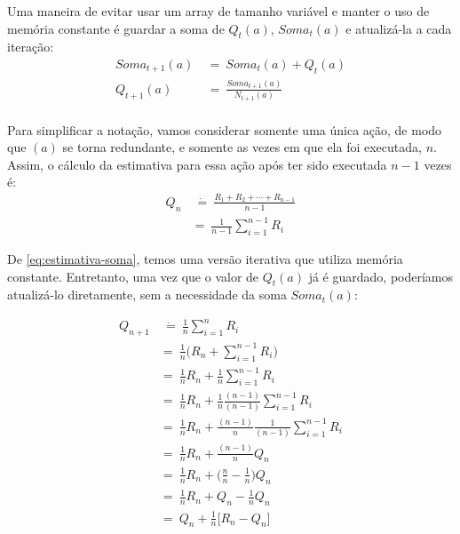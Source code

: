 \documentclass{article}
\begin{document}
        Uma maneira de evitar usar um array de tamanho variável e manter o uso de memória constante é guardar a soma de $Q_t(a)$, $Soma_t(a)$ e atualizá-la a cada iteração:
        \begin{equation}
        \label{eq:estimativa-soma}
        \begin{split}
            Soma_{t+1}(a) & \ = \ Soma_t(a) + Q_t(a) \\
            Q_{t+1}(a) & \ = \ \frac{Soma_{t+1}(a)}{N_{t+1}(a)}  \\
        \end{split}
        \end{equation}

        Para simplificar a notação, vamos considerar somente uma única ação, de modo que $(a)$ se torna redundante, e somente as vezes em que ela foi executada, $n$. Assim, o cálculo da estimativa para essa ação após ter sido executada $n-1$ vezes é:
        \begin{equation}
        \begin{split}
            Q_n & \ \dot{=} \ \frac{R_1 + R_2 + \cdots + R_{n-1}}{n - 1}\\
            & = \ \frac{1}{n-1} \sum_{i=1}^{n-1} R_i
        \end{split}
        \end{equation}
        
        De \eqref{eq:estimativa-soma}, temos uma versão iterativa que utiliza memória constante. Entretanto, uma vez que o valor de $Q_t(a)$ já é guardado, poderíamos atualizá-lo diretamente, sem a necessidade da soma $Soma_t(a)$:
        
        \begin{subequations}
        \begin{align}
            Q_{n+1} & \ \dot{=} \ \frac{1}{n} \sum_{i=1}^{n} R_i\\
            & = \ \frac{1}{n} \Bigg( R_n + \sum_{i=1}^{n-1} R_i \Bigg) \nonumber\\
            & = \ \frac{1}{n} R_n + \frac{1}{n} \sum_{i=1}^{n-1} R_i \nonumber\\
            & = \ \frac{1}{n} R_n + \frac{1}{n} \frac{(n-1)}{(n-1)} \sum_{i=1}^{n-1} R_i \nonumber\\
            & = \ \frac{1}{n} R_n + \frac{(n-1)}{n} \frac{1}{(n-1)} \sum_{i=1}^{n-1} R_i \nonumber\\
            & = \ \frac{1}{n} R_n + \frac{(n-1)}{n} Q_n \nonumber\\
            & = \ \frac{1}{n} R_n + \Bigg( \frac{n}{n} - \frac{1}{n} \Bigg) Q_n \nonumber\\
            & = \ \frac{1}{n} R_n + Q_n - \frac{1}{n} Q_n \nonumber\\
            \label{eq:estimativa-qn}
            & = \ Q_n + \frac{1}{n} \Big[ R_n - Q_n \Big]
        \end{align}
        \end{subequations}
        
\end{document}
